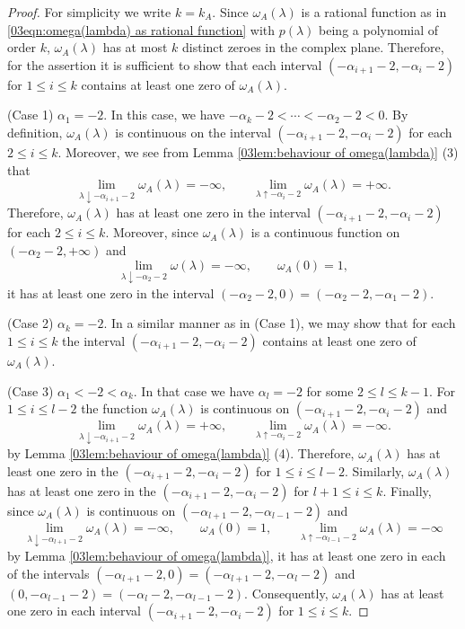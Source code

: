 \documentclass[12pt,a4paper]{article}
\newcommand{\1}{{\bm 1}}
\numberwithin{equation}{section}
\begin{document}
\begin{proof}
For simplicity we write $k=k_A$.
Since $\omega_A(\lambda)$ is a rational function
as in \eqref{03eqn:omega(lambda) as rational function}
with $p(\lambda)$ being a polynomial of order $k$,
$\omega_A(\lambda)$ has at most $k$ distinct zeroes
in the complex plane.
Therefore, for the assertion it is sufficient to show that
each interval $(-\alpha_{i+1}-2,-\alpha_i-2)$
for $1\le i\le k$
contains at least one zero of $\omega_A(\lambda)$.

(Case 1) $\alpha_1=-2$. 
In this case, we have $-\alpha_k-2<\dotsb<-\alpha_2-2<0$.
By definition,
$\omega_A(\lambda)$ is continuous on the interval
$(-\alpha_{i+1}-2,-\alpha_i-2)$ for each $2\le i\le k$.
Moreover, 
we see from Lemma \ref{03lem:behaviour of omega(lambda)} (3) that
\[
\lim_{\lambda\downarrow -\alpha_{i+1}-2}\omega_A(\lambda)=-\infty,
\qquad
\lim_{\lambda\uparrow -\alpha_i-2}\omega_A(\lambda)=+\infty.
\]
Therefore, $\omega_A(\lambda)$ has at least one zero
in the interval $(-\alpha_{i+1}-2,-\alpha_i-2)$ for each $2\le i\le k$.
Moreover, since 
$\omega_A(\lambda)$ is a continuous function on
$(-\alpha_2-2,+\infty)$ and
\[
\lim_{\lambda\downarrow -\alpha_2-2}\omega(\lambda)=-\infty,
\qquad
\omega_A(0)=1,
\]
it has at least one zero
in the interval $(-\alpha_2-2,0)=(-\alpha_2-2,-\alpha_1-2)$.

(Case 2) $\alpha_k=-2$. In a similar manner as in (Case 1),
we may show that
for each $1\le i\le k$ the interval $(-\alpha_{i+1}-2,-\alpha_i-2)$
contains at least one zero of $\omega_A(\lambda)$.


(Case 3) $\alpha_1<-2<\alpha_k$. In that case we have
$\alpha_l=-2$ for some $2\le l \le k-1$.
For $1\le i\le l-2$ the function $\omega_A(\lambda)$ is continuous
on $(-\alpha_{i+1}-2,-\alpha_i-2)$ and
\[
\lim_{\lambda\downarrow -\alpha_{i+1}-2}\omega_A(\lambda)=+\infty,
\qquad
\lim_{\lambda\uparrow -\alpha_i-2}\omega_A(\lambda)=-\infty.
\]
by Lemma \ref{03lem:behaviour of omega(lambda)} (4).
Therefore, $\omega_A(\lambda)$ has at least one zero
in the $(-\alpha_{i+1}-2,-\alpha_i-2)$ for $1\le i\le l-2$.
Similarly, $\omega_A(\lambda)$ has at least one zero
in the $(-\alpha_{i+1}-2,-\alpha_i-2)$ for
$l+1\le i\le k$.
Finally, since $\omega_A(\lambda)$ is continuous
on $(-\alpha_{l+1}-2,-\alpha_{l-1}-2)$ and
\[
\lim_{\lambda\downarrow -\alpha_{l+1}-2}\omega_A(\lambda)=-\infty,
\qquad
\omega_A(0)=1,
\qquad
\lim_{\lambda\uparrow -\alpha_{l-1}-2}\omega_A(\lambda)=-\infty
\]
by Lemma \ref{03lem:behaviour of omega(lambda)},
it has at least one zero
in each of the intervals
$(-\alpha_{l+1}-2,0)=(-\alpha_{l+1}-2,-\alpha_l-2)$
and $(0,-\alpha_{l-1}-2)=(-\alpha_l-2,-\alpha_{l-1}-2)$.
Consequently, $\omega_A(\lambda)$ 
has at least one zero in each interval $(-\alpha_{i+1}-2,-\alpha_i-2)$
for $1\le i\le k$.
\end{proof}
\end{document}
